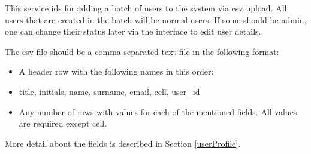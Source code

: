 This service ids for adding a batch of users to the system via csv upload. All users that are created in the batch will be normal users. If some should be admin, one can change their status later via the interface to edit user details. 

The csv file should be a comma separated text file in the following format:
\begin{itemize}
\item A header row with the following names in this order:
\item title, initials, name, surname, email, cell, user\_id
\item Any number of rows with values for each of the mentioned fields. All values are required except cell.
\end{itemize}

More detail about the fields is described in Section \ref{userProfile}.

